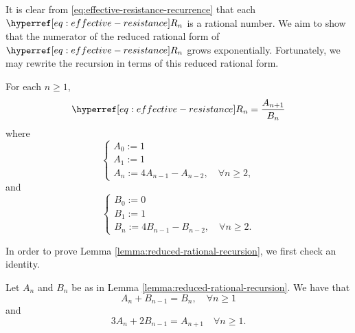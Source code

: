 \documentclass[12pt]{amsart}
\numberwithin{equation}{section}
\begin{document}
	It is clear from \eqref{eq:effective-resistance-recurrence} that each $\Rn{n}$ is a rational number. We aim to show that the 
	numerator of the reduced rational form of $\Rn{n}$ grows exponentially. Fortunately, we may rewrite the recursion in terms of this reduced rational form.
	\begin{lemma} \label{lemma:reduced-rational-recursion}
		For each $n \geq 1$, 
		\begin{equation} \label{eq:rec-form}
			\Rn{n} = \frac{A_{n+1}}{B_n}
		\end{equation}
		where
		\begin{equation} \label{eq:A-recursion}
			\begin{cases}
				A_0 := 1 \\
				A_1 := 1 \\
				A_{n} := 4 A_{n-1} - A_{n-2}, \quad \forall n \geq 2,
			\end{cases}
		\end{equation}
		and
		\begin{equation} \label{eq:B-recursion}
			\begin{cases}
				B_0 := 0 \\
				B_1 := 1 \\
				B_{n} := 4 B_{n-1} - B_{n-2}, \quad \forall n \geq 2.
			\end{cases}
		\end{equation}
	\end{lemma}
	In order to prove Lemma \ref{lemma:reduced-rational-recursion}, we first check an identity. 
	\begin{lemma} \label{lemma:num-denom-recs}
		Let $A_n$ and $B_n$ be as in Lemma \ref{lemma:reduced-rational-recursion}. 
		We have that
		\begin{equation} \label{eq:rec-form-1}
			A_n + B_{n-1} = B_{n}, \quad \forall n \geq 1
		\end{equation}
		and
		\begin{equation} \label{eq:rec-form-2}
			3 A_n +2  B_{n-1} = A_{n+1}  \quad \forall n \geq 1.
		\end{equation}
		
	\end{lemma}
	
\end{document}
